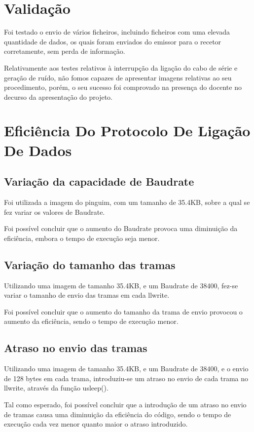 \documentclass{article}
\begin{document}
\section{Validação}
Foi testado o envio de vários ficheiros, incluindo ficheiros com uma elevada quantidade de dados, os quais foram enviados do emissor para o recetor corretamente, sem perda de informação.

Relativamente aos testes relativos à interrupção da ligação do cabo de série e geração de ruído, não fomos capazes de apresentar imagens relativas ao seu procedimento, porém, o seu sucesso foi comprovado na presença do docente no decurso da apresentação do projeto.


\section{Eficiência Do Protocolo De Ligação De Dados}

\subsection{Variação da capacidade de Baudrate}

Foi utilizada a imagem do pinguim, com um tamanho de 35.4KB, sobre a qual se fez variar os valores de Baudrate.

Foi possível concluir que o aumento do Baudrate provoca uma diminuição da eficiência, embora o tempo de execução seja menor.

\subsection{Variação do tamanho das tramas}

Utilizando uma imagem de tamanho 35.4KB, e um Baudrate de 38400, fez-se variar o tamanho de envio das tramas em cada llwrite.

Foi possível concluir que o aumento do tamanho da trama de envio provocou o aumento da eficiência, sendo o tempo de execução menor.

\subsection{Atraso no envio das tramas}

Utilizando uma imagem de tamanho 35.4KB, e um Baudrate de 38400, e o envio de 128 bytes em cada trama, introduziu-se um atraso no envio de cada trama no llwrite, através da função usleep().

Tal como esperado, foi possível concluir que a introdução de um atraso no envio de tramas causa uma diminuição da eficiência do código, sendo o tempo de execução cada vez menor quanto maior o atraso introduzido.
\end{document}
